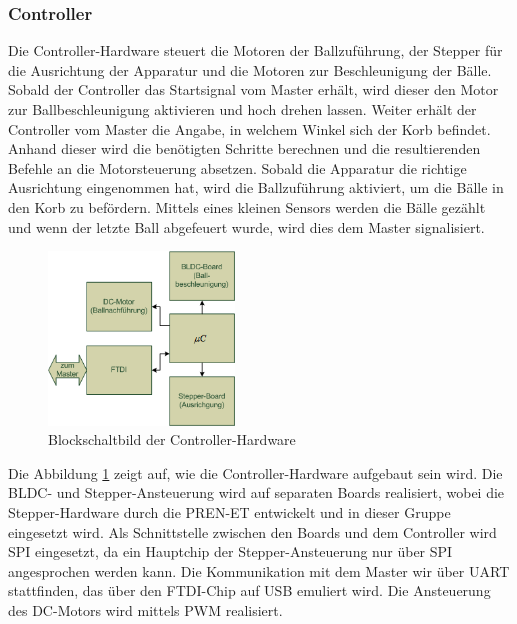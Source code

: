 ﻿\subsubsection{Controller}
	Die Controller-Hardware steuert die Motoren der Ballzuführung, der Stepper für die Ausrichtung der Apparatur und die Motoren zur Beschleunigung der Bälle. Sobald der Controller das Startsignal vom Master erhält, wird dieser den Motor zur Ballbeschleunigung aktivieren und hoch drehen lassen. Weiter erhält der Controller vom Master die Angabe, in welchem Winkel sich der Korb befindet. Anhand dieser wird die benötigten Schritte berechnen und die resultierenden Befehle an die Motorsteuerung absetzen. Sobald die Apparatur die richtige Ausrichtung eingenommen hat, wird die Ballzuführung aktiviert, um die Bälle in den Korb zu befördern. Mittels eines kleinen Sensors werden die Bälle gezählt und wenn der letzte Ball abgefeuert wurde, wird dies dem Master signalisiert.\\
	\begin{figure}
		\centering
		\includegraphics[width=0.44\textwidth]{Enddokumentation/Loesungskonzept/Bilder/Blockschaltbild_Controller.png}
		\caption{Blockschaltbild der Controller-Hardware}
		\label{fig:Blockschaltbild_Controller}
	\end{figure}
	Die Abbildung \ref{fig:Blockschaltbild_Controller} zeigt auf, wie die Controller-Hardware aufgebaut sein wird. Die BLDC- und Stepper-Ansteuerung wird auf separaten Boards realisiert, wobei die Stepper-Hardware durch die PREN-ET
	entwickelt und in dieser Gruppe eingesetzt wird. Als Schnittstelle zwischen den Boards und dem Controller wird SPI eingesetzt, da ein Hauptchip der Stepper-Ansteuerung nur über SPI angesprochen werden kann. Die Kommunikation mit dem Master wir über UART stattfinden, das über den FTDI-Chip auf USB emuliert wird. Die Ansteuerung des DC-Motors wird mittels PWM realisiert.